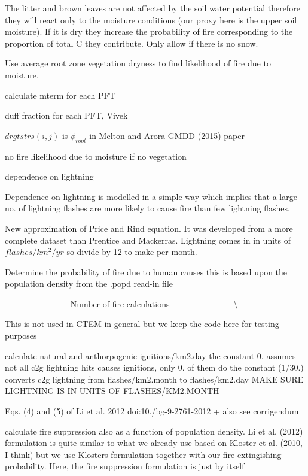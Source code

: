 The litter and brown leaves are not affected by the soil water potential therefore they will react only to the moisture conditions (our proxy here is the upper soil moisture). If it is dry they increase the probability of fire corresponding to the proportion of total C they contribute. Only allow if there is no snow.

Use average root zone vegetation dryness to find likelihood of fire due to moisture.

calculate mterm for each P\+F\+T

duff fraction for each P\+F\+T, Vivek

$drgtstrs(i,j)$ is $\phi_{root}$ in Melton and Arora G\+M\+D\+D (2015) paper

no fire likelihood due to moisture if no vegetation


\begin{DoxyEnumerate}
\item dependence on lightning
\end{DoxyEnumerate}

Dependence on lightning is modelled in a simple way which implies that a large no. of lightning flashes are more likely to cause fire than few lightning flashes.

New approximation of Price and Rind equation. It was developed from a more complete dataset than Prentice and Mackerras. Lightning comes in in units of $flashes/km^2/yr$ so divide by 12 to make per month.

Determine the probability of fire due to human causes this is based upon the population density from the .popd read-\/in file

----------------------- Number of fire calculations -\/---------------------\textbackslash{}

This is not used in C\+T\+E\+M in general but we keep the code here for testing purposes

calculate natural and anthorpogenic ignitions/km2.\+day the constant 0. assumes not all c2g lightning hits causes ignitions, only 0. of them do the constant (1/30.) converts c2g lightning from flashes/km2.\+month to flashes/km2.\+day M\+A\+K\+E S\+U\+R\+E L\+I\+G\+H\+T\+N\+I\+N\+G I\+S I\+N U\+N\+I\+T\+S O\+F F\+L\+A\+S\+H\+E\+S/\+K\+M2.\+M\+O\+N\+T\+H

Eqs. (4) and (5) of Li et al. 2012 doi\+:10./bg-\/9-\/2761-\/2012 + also see corrigendum

calculate fire suppression also as a function of population density. Li et al. (2012) formulation is quite similar to what we already use based on Kloster et al. (2010, I think) but we use Kloster\textquotesingle{}s formulation together with our fire extingishing probability. Here, the fire suppression formulation is just by itself

